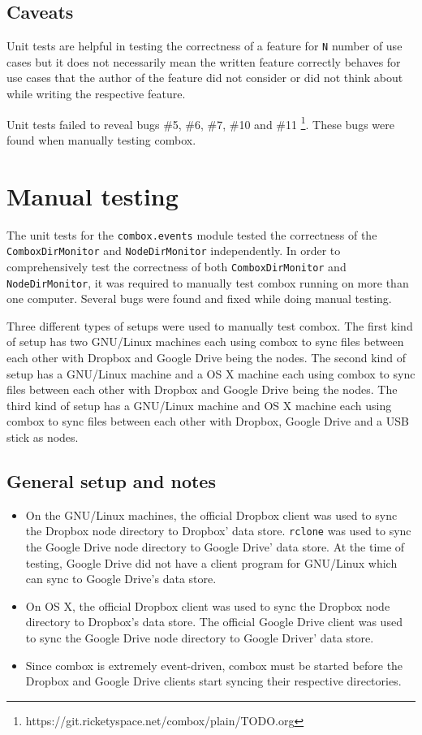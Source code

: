 \subsection{Caveats}

Unit tests are helpful in testing the correctness of a feature for
\verb+N+ number of use cases but it does not necessarily mean the
written feature correctly behaves for use cases that the author of the
feature did not consider or did not think about while writing the
respective feature.

Unit tests failed to reveal bugs \#5, \#6, \#7, \#10 and \#11
\footnote{https://git.ricketyspace.net/combox/plain/TODO.org}. These
bugs were found when manually testing combox.

\section{Manual testing}\label{sec:4-manual-testing}

The unit tests for the \verb+combox.events+ module tested the
correctness of the \\ \verb+ComboxDirMonitor+ and
\verb+NodeDirMonitor+ independently. In order to comprehensively test
the correctness of both \verb+ComboxDirMonitor+ and
\verb+NodeDirMonitor+, it was required to manually test combox running
on more than one computer. Several bugs were found and fixed while
doing manual testing.

Three different types of setups were used to manually test combox. The
first kind of setup has two GNU/Linux machines each using combox to
sync files between each other with Dropbox and Google Drive being the
nodes. The second kind of setup has a GNU/Linux machine and a OS X
machine each using combox to sync files between each other with
Dropbox and Google Drive being the nodes. The third kind of setup has
a GNU/Linux machine and OS X machine each using combox to sync files
between each other with Dropbox, Google Drive and a USB stick as
nodes.

\subsection{General setup and notes}

\begin{itemize}
\item On the GNU/Linux machines, the official Dropbox client was used
  to sync the Dropbox node directory to Dropbox' data
  store. \verb+rclone+ \cite{program:rclone} was used to sync the
  Google Drive node directory to Google Drive' data store. At the time
  of testing, Google Drive did not have a client program for
  GNU/Linux which can sync to Google Drive's data store.
\item On OS X, the official Dropbox client was used to sync the
  Dropbox node directory to Dropbox's data store. The official Google
  Drive client was used to sync the Google Drive node directory to
  Google Driver' data store.
\item Since combox is extremely event-driven, combox must be started
  before the Dropbox and Google Drive clients start syncing their
  respective directories.
\end{itemize}

